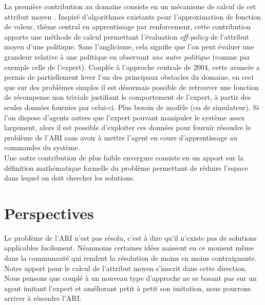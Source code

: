 \documentclass[11pt]{article}
\begin{document}
  La première contribution au domaine consiste en un mécanisme de calcul de cet attribut moyen \cite{klein2011batch}. Inspiré d'algorithmes existants pour l'approximation de fonction de valeur, thème central en apprentissage par renforcement, cette contribution apporte une méthode de calcul permettant l'évaluation \emph{off-policy} de l'attribut moyen d'une politique. Sans l'anglicisme, cela signifie que l'on peut évaluer une grandeur relative à une politique en observant \emph{une autre politique} (comme par exemple celle de l'expert). Couplée à l'approche centrale de 2004, cette avancée a permis de partiellement lever l'un des principaux obstacles du domaine, en ceci que sur des problèmes simples il est désormais possible de retrouver une fonction de récompense non triviale justifiant le comportement de l'expert, à partir des seules données fournies par celui-ci. Plus besoin de modèle (ou de simulateur). Si l'on dispose d'agents autres que l'expert pouvant manipuler le système assez largement, alors il est possible d'exploiter ces données pour fournir résoudre le problème de l'ARI sans avoir à mettre l'agent en cours d'apprentissage au commandes du système.\\

  Une autre contribution de plus faible envergure consiste en un apport sur la définition mathématique formelle du problème \cite{klein2011dimensionality} permettant de réduire l'espace dans lequel on doit chercher les solutions.
\section{Perspectives}
\label{sec-4}

  
  Le problème de l'ARI n'est pas résolu, c'est à dire qu'il n'existe pas de solutions applicables facilement. Néanmoins certaines idées naissent en ce moment même dans la communauté qui rendent la résolution de moins en moins contraignante. Notre apport pour le calcul de l'attribut moyen s'inscrit dans cette direction. Nous pensons que couplé à un nouveau type d'approche ne se basant pas sur un agent imitant l'expert et améliorant petit à petit son imitation, nous pourrons arriver à résoudre l'ARI.



\end{document}
